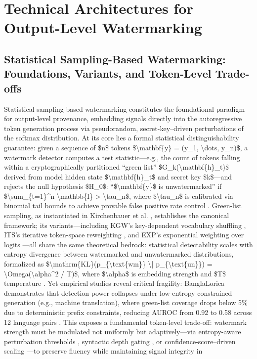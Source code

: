\documentclass[11pt,a4paper]{article}
\begin{document}
\section{Technical Architectures for Output-Level Watermarking}



\subsection{Statistical Sampling-Based Watermarking: Foundations, Variants, and Token-Level Trade-offs}


Statistical sampling-based watermarking constitutes the foundational paradigm for output-level provenance, embedding signals directly into the autoregressive token generation process via pseudorandom, secret-key--driven perturbations of the softmax distribution. At its core lies a formal statistical distinguishability guarantee: given a sequence of \$n\$ tokens \$\textbackslash{}mathbf\{y\} = (y\_1, \textbackslash{}dots, y\_n)\$, a watermark detector computes a test statistic---e.g., the count of tokens falling within a cryptographically partitioned ``green list'' \$G\_k(\textbackslash{}mathbf\{h\}\_t)\$ derived from model hidden state \$\textbackslash{}mathbf\{h\}\_t\$ and secret key \$k\$---and rejects the null hypothesis \$H\_0\$: ``\$\textbackslash{}mathbf\{y\}\$ is unwatermarked'' if \$\textbackslash{}sum\_\{t=1\}\textasciicircum{}n \textbackslash{}mathbb\{I\}\cite{arxiv:2506.06407} > \textbackslash{}tau\_n\$, where \$\textbackslash{}tau\_n\$ is calibrated via binomial tail bounds to achieve provable false positive rate control \cite{doi:10.1038/s41586-024-08025-4}. Green-list sampling, as instantiated in Kirchenbauer et al. \cite{doi:10.1038/s41586-024-08025-4}, establishes the canonical framework; its variants---including KGW's key-dependent vocabulary shuffling \cite{doi:10.1038/s41586-024-08025-4}, ITS's iterative token-space reweighting \cite{doi:10.1038/s41586-024-08025-4}, and EXP's exponential weighting over logits \cite{doi:10.1145/3321705.3329808}---all share the same theoretical bedrock: statistical detectability scales with entropy divergence between watermarked and unwatermarked distributions, formalized as \$\textbackslash{}mathrm\{KL\}(p\_\{\textbackslash{}text\{wm\}\} \textbackslash{}| p\_\{\textbackslash{}text\{un\}\}) = \textbackslash{}Omega(\textbackslash{}alpha\textasciicircum{}2 / T)\$, where \$\textbackslash{}alpha\$ is embedding strength and \$T\$ temperature \cite{arxiv:2402.05864}. Yet empirical studies reveal critical fragility: BanglaLorica demonstrates that detection power collapses under low-entropy constrained generation (e.g., machine translation), where green-list coverage drops below 5\% due to deterministic prefix constraints, reducing AUROC from 0.92 to 0.58 across 12 language pairs \cite{doi:10.1038/s41586-024-08025-4}. This exposes a fundamental token-level trade-off: watermark strength must be modulated not uniformly but adaptively---via entropy-aware perturbation thresholds \cite{doi:10.1038/s41586-024-08025-4}, syntactic depth gating \cite{doi:10.1038/s41586-024-08025-4}, or confidence-score--driven scaling \cite{doi:10.1038/s41586-024-08025-4}---to preserve fluency while maintaining signal integrity in 
\end{document}
